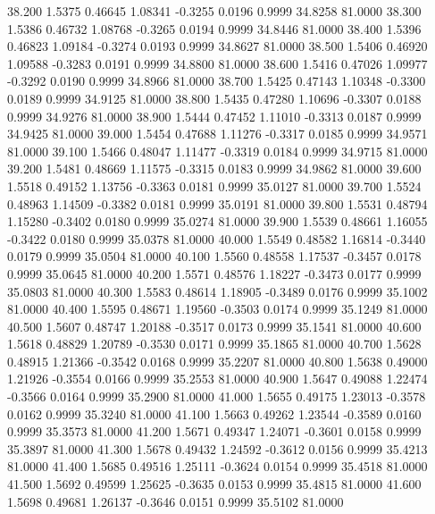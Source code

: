   38.200   1.5375   0.46645   1.08341  -0.3255   0.0196   0.9999  34.8258  81.0000
  38.300   1.5386   0.46732   1.08768  -0.3265   0.0194   0.9999  34.8446  81.0000
  38.400   1.5396   0.46823   1.09184  -0.3274   0.0193   0.9999  34.8627  81.0000
  38.500   1.5406   0.46920   1.09588  -0.3283   0.0191   0.9999  34.8800  81.0000
  38.600   1.5416   0.47026   1.09977  -0.3292   0.0190   0.9999  34.8966  81.0000
  38.700   1.5425   0.47143   1.10348  -0.3300   0.0189   0.9999  34.9125  81.0000
  38.800   1.5435   0.47280   1.10696  -0.3307   0.0188   0.9999  34.9276  81.0000
  38.900   1.5444   0.47452   1.11010  -0.3313   0.0187   0.9999  34.9425  81.0000
  39.000   1.5454   0.47688   1.11276  -0.3317   0.0185   0.9999  34.9571  81.0000
  39.100   1.5466   0.48047   1.11477  -0.3319   0.0184   0.9999  34.9715  81.0000
  39.200   1.5481   0.48669   1.11575  -0.3315   0.0183   0.9999  34.9862  81.0000
  39.600   1.5518   0.49152   1.13756  -0.3363   0.0181   0.9999  35.0127  81.0000
  39.700   1.5524   0.48963   1.14509  -0.3382   0.0181   0.9999  35.0191  81.0000
  39.800   1.5531   0.48794   1.15280  -0.3402   0.0180   0.9999  35.0274  81.0000
  39.900   1.5539   0.48661   1.16055  -0.3422   0.0180   0.9999  35.0378  81.0000
  40.000   1.5549   0.48582   1.16814  -0.3440   0.0179   0.9999  35.0504  81.0000
  40.100   1.5560   0.48558   1.17537  -0.3457   0.0178   0.9999  35.0645  81.0000
  40.200   1.5571   0.48576   1.18227  -0.3473   0.0177   0.9999  35.0803  81.0000
  40.300   1.5583   0.48614   1.18905  -0.3489   0.0176   0.9999  35.1002  81.0000
  40.400   1.5595   0.48671   1.19560  -0.3503   0.0174   0.9999  35.1249  81.0000
  40.500   1.5607   0.48747   1.20188  -0.3517   0.0173   0.9999  35.1541  81.0000
  40.600   1.5618   0.48829   1.20789  -0.3530   0.0171   0.9999  35.1865  81.0000
  40.700   1.5628   0.48915   1.21366  -0.3542   0.0168   0.9999  35.2207  81.0000
  40.800   1.5638   0.49000   1.21926  -0.3554   0.0166   0.9999  35.2553  81.0000
  40.900   1.5647   0.49088   1.22474  -0.3566   0.0164   0.9999  35.2900  81.0000
  41.000   1.5655   0.49175   1.23013  -0.3578   0.0162   0.9999  35.3240  81.0000
  41.100   1.5663   0.49262   1.23544  -0.3589   0.0160   0.9999  35.3573  81.0000
  41.200   1.5671   0.49347   1.24071  -0.3601   0.0158   0.9999  35.3897  81.0000
  41.300   1.5678   0.49432   1.24592  -0.3612   0.0156   0.9999  35.4213  81.0000
  41.400   1.5685   0.49516   1.25111  -0.3624   0.0154   0.9999  35.4518  81.0000
  41.500   1.5692   0.49599   1.25625  -0.3635   0.0153   0.9999  35.4815  81.0000
  41.600   1.5698   0.49681   1.26137  -0.3646   0.0151   0.9999  35.5102  81.0000
